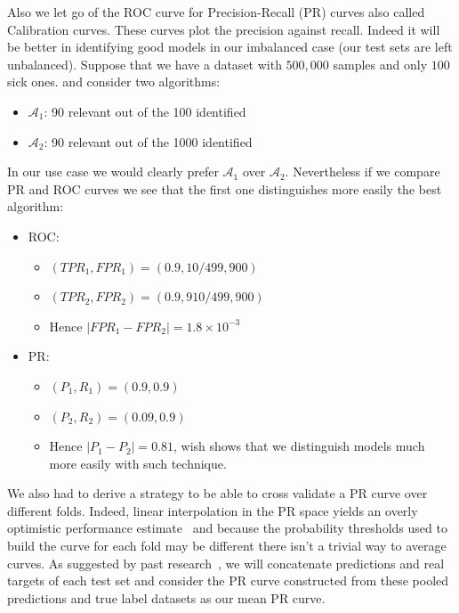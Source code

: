 Also we let go of the ROC curve for Precision-Recall (PR) curves also called Calibration curves. These curves plot the precision against recall. Indeed it will be better in identifying good models in our imbalanced case (our test sets are left unbalanced). Suppose that we have a dataset with $500,000$ samples and only $100$ sick ones. and consider two algorithms:
\begin{itemize}[noitemsep,topsep=0pt]
	\item $\mathcal{A}_1$: 90 relevant out of the 100 identified
	\item $\mathcal{A}_2$: 90 relevant out of the 1000 identified
\end{itemize}
In our use case we would clearly prefer $\mathcal{A}_1$ over $\mathcal{A}_2$. Nevertheless if we compare PR and ROC curves we see that the first one distinguishes more easily the best algorithm:
\begin{itemize}
	\item ROC: 
		\begin{itemize}[noitemsep,topsep=0pt]
		\item $({TPR}_1,{FPR}_1)=(0.9,10/499,900)$
		\item $({TPR}_2,{FPR}_2)=(0.9,910/499,900)$
		\item Hence $|{FPR}_1-{FPR}_2|= 1.8\times 10^{-3}$
		\end{itemize}
	\item PR: 
		\begin{itemize}[noitemsep,topsep=0pt]
		\item $({P}_1,{R}_1)=(0.9,0.9)$
		\item $({P}_2,{R}_2)=(0.09,0.9)$
		\item Hence $|{P}_1-{P}_2|= 0.81$, wish shows that we distinguish models much more easily with such technique.
		\end{itemize}
\end{itemize}

We also had to derive a strategy to be able to cross validate a PR curve over different folds. Indeed, linear interpolation in the PR space yields an overly optimistic performance estimate~\cite{PRcurve} and because the probability thresholds used to build the curve for each fold may be different there isn't a trivial way to average curves. As suggested by past research~\cite{apples}, we will concatenate predictions and real targets of each test set and consider the PR curve constructed from these pooled predictions and true label datasets as our mean PR curve.

